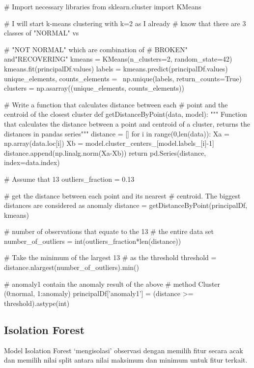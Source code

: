 \begin{python}
# Import necessary libraries
from sklearn.cluster import KMeans

# I will start k-means clustering with k=2 as I already
# know that there are 3 classes of "NORMAL" vs 

# "NOT NORMAL" which are combination of 
# BROKEN" and"RECOVERING"
kmeans = KMeans(n_clusters=2, random_state=42)
kmeans.fit(principalDf.values)
labels = kmeans.predict(principalDf.values)
unique_elements, counts_elements = \
    np.unique(labels, return_counts=True)
clusters = np.asarray((unique_elements, counts_elements))

# Write a function that calculates distance between each 
# point and the centroid of the closest cluster
def getDistanceByPoint(data, model):
    """ Function that calculates the distance between
     a point and centroid of a cluster, 
            returns the distances in pandas series"""
    distance = []
    for i in range(0,len(data)):
        Xa = np.array(data.loc[i])
        Xb = model.cluster_centers_[model.labels_[i]-1]
        distance.append(np.linalg.norm(Xa-Xb))
    return pd.Series(distance, index=data.index)

# Assume that 13%
outliers_fraction = 0.13

# get the distance between each point and its nearest 
# centroid. The biggest distances are considered as anomaly
distance = getDistanceByPoint(principalDf, kmeans)

# number of observations that equate to the 13%
# the entire data set
number_of_outliers = int(outliers_fraction*len(distance))

# Take the minimum of the largest 13%
# as the threshold
threshold = distance.nlargest(number_of_outliers).min()

# anomaly1 contain the anomaly result of the above 
# method Cluster (0:normal, 1:anomaly) 
principalDf['anomaly1'] = (distance >= threshold).astype(int)
\end{python}

    \subsection{Isolation Forest}

    Model Isolation Forest ‘mengisolasi’ observasi dengan memilih fitur secara acak dan memilih nilai split antara nilai maksimum dan minimum untuk fitur terkait.

